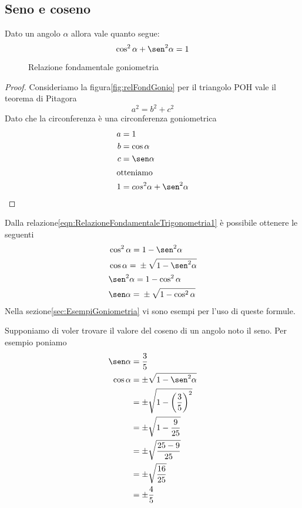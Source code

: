 \subsection{Seno e coseno}
\label{sec:RelazioniFondamentaliSenoCoseno}
\begin{teorema}
Dato un angolo $\alpha$ allora vale quanto segue:
\begin{equation*}
\cos^2\alpha+\sen^2\alpha=1\label{eqn:RelazioneFondamentaleTrigonometria1}
\end{equation*}
\end{teorema}
\begin{figure}
	\centering
	
\caption{Relazione fondamentale goniometria}
\label{fig:relFondGonio}
\end{figure}
\begin{proof}
	Consideriamo la figura\nobs\vref{fig:relFondGonio} per il triangolo POH vale il teorema di Pitagora \[a^2=b^2+c^2\] Dato che la circonferenza è una circonferenza goniometrica
	\begin{align*}
	a&=1\\
	b&=\cos\alpha\\
	c&=\sen\alpha\\
	\intertext{otteniamo}
	1&=cos^2\alpha+\sen^2\alpha\\
	\end{align*}
\end{proof}
Dalla relazione\nobs\vref{eqn:RelazioneFondamentaleTrigonometria1} è possibile ottenere le seguenti
\begin{align*}
&\cos^{2}\alpha={}1-\sen^{2}\alpha\\
&\cos\alpha={}\pm\sqrt{1-\sen^{2}\alpha}\\
&\sen^{2}\alpha={}1-\cos^{2}\alpha \\
&\sen\alpha={}\pm\sqrt{1-\cos^{2}\alpha}
\end{align*}
Nella sezione\nobs\vref{sec:EsempiGoniometria} vi sono esempi per l'uso di queste formule. 
\begin{esempio}
Supponiamo di voler trovare il valore del coseno di un angolo noto il seno. Per esempio poniamo 
\begin{align*}
\sen\alpha&{}=\dfrac{3}{5}\\
\cos\alpha&=\pm\sqrt{1-\sen^2\alpha}\\
&=\pm\sqrt{1-\left(\dfrac{3}{5}\right)^2}\\
&=\pm\sqrt{1-\dfrac{9}{25}}\\
&=\pm\sqrt{\dfrac{25-9}{25}}\\
&=\pm\sqrt{\dfrac{16}{25}} \\
&=\pm\dfrac{4}{5} 
\end{align*}
\end{esempio}
